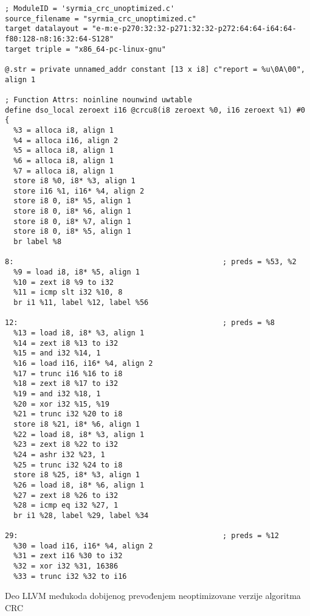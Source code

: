\documentclass[12pt,oneside]{memoir}
\begin{document}
\begin{listing}
\begin{verbatim}
; ModuleID = 'syrmia_crc_unoptimized.c'
source_filename = "syrmia_crc_unoptimized.c"
target datalayout = "e-m:e-p270:32:32-p271:32:32-p272:64:64-i64:64-f80:128-n8:16:32:64-S128"
target triple = "x86_64-pc-linux-gnu"

@.str = private unnamed_addr constant [13 x i8] c"report = %u\0A\00", align 1

; Function Attrs: noinline nounwind uwtable
define dso_local zeroext i16 @crcu8(i8 zeroext %0, i16 zeroext %1) #0 {
  %3 = alloca i8, align 1
  %4 = alloca i16, align 2
  %5 = alloca i8, align 1
  %6 = alloca i8, align 1
  %7 = alloca i8, align 1
  store i8 %0, i8* %3, align 1
  store i16 %1, i16* %4, align 2
  store i8 0, i8* %5, align 1
  store i8 0, i8* %6, align 1
  store i8 0, i8* %7, align 1
  store i8 0, i8* %5, align 1
  br label %8

8:                                                ; preds = %53, %2
  %9 = load i8, i8* %5, align 1
  %10 = zext i8 %9 to i32
  %11 = icmp slt i32 %10, 8
  br i1 %11, label %12, label %56

12:                                               ; preds = %8
  %13 = load i8, i8* %3, align 1
  %14 = zext i8 %13 to i32
  %15 = and i32 %14, 1
  %16 = load i16, i16* %4, align 2
  %17 = trunc i16 %16 to i8
  %18 = zext i8 %17 to i32
  %19 = and i32 %18, 1
  %20 = xor i32 %15, %19
  %21 = trunc i32 %20 to i8
  store i8 %21, i8* %6, align 1
  %22 = load i8, i8* %3, align 1
  %23 = zext i8 %22 to i32
  %24 = ashr i32 %23, 1
  %25 = trunc i32 %24 to i8
  store i8 %25, i8* %3, align 1
  %26 = load i8, i8* %6, align 1
  %27 = zext i8 %26 to i32
  %28 = icmp eq i32 %27, 1
  br i1 %28, label %29, label %34

29:                                               ; preds = %12
  %30 = load i16, i16* %4, align 2
  %31 = zext i16 %30 to i32
  %32 = xor i32 %31, 16386
  %33 = trunc i32 %32 to i16
\end{verbatim}
\caption{Deo LLVM međukoda dobijenog prevođenjem neoptimizovane verzije algoritma CRC}
\label{syrmia_unopt_crc_ir}
\centering
\end{listing}
\end{document}
